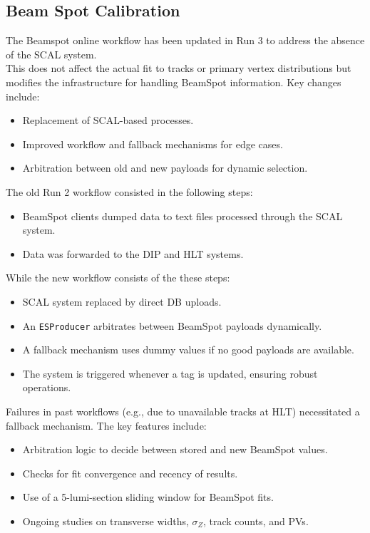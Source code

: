 \subsection{Beam Spot Calibration}

The Beamspot online workflow has been updated in Run 3 to address the absence of the SCAL system.\\
This does not affect the actual fit to tracks or primary vertex distributions but modifies the infrastructure for handling BeamSpot information. Key changes include:
\begin{itemize}
    \item Replacement of SCAL-based processes.
    \item Improved workflow and fallback mechanisms for edge cases.
    \item Arbitration between old and new payloads for dynamic selection.
\end{itemize}

The old Run 2 workflow consisted in the following steps:
\begin{itemize}
    \item BeamSpot clients dumped data to text files processed through the SCAL system.
    \item Data was forwarded to the DIP and HLT systems.
\end{itemize}

While the new workflow consists of the these steps:
\begin{itemize}
    \item SCAL system replaced by direct DB uploads.
    \item An \texttt{ESProducer} arbitrates between BeamSpot payloads dynamically.
    \item A fallback mechanism uses dummy values if no good payloads are available.
    \item The system is triggered whenever a tag is updated, ensuring robust operations.
\end{itemize}

Failures in past workflows (e.g., due to unavailable tracks at HLT) necessitated a fallback mechanism. The key features include:
\begin{itemize}
    \item Arbitration logic to decide between stored and new BeamSpot values.
    \item Checks for fit convergence and recency of results.
    \item Use of a 5-lumi-section sliding window for BeamSpot fits.
    \item Ongoing studies on transverse widths, $\sigma_Z$, track counts, and PVs.
\end{itemize}


